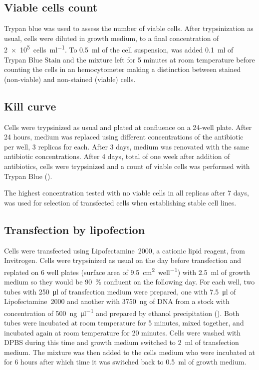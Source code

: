     \subsection{Viable cells count}
      \label{sec:methods:trypan-blue}
      Trypan blue was used to assess the number of viable cells.
      After trypsinization as usual, cells were diluted in growth medium,
      to a final concentration of \SI{2e5}{cells\per\ml}.
      To \SI{0.5}{\ml} of the cell suspension, was added \SI{0.1}{\ml}
      of  Trypan Blue Stain and the mixture left for 5 minutes
      at room temperature before counting
      the cells in an hemocytometer making a distinction between
      stained (non-viable) and non-stained (viable) cells.

    \subsection{Kill curve}
      \label{sec:methods:kill-curve}
      Cells were trypsinized as usual and plated at  confluence on
      a 24-well plate. After 24 hours, medium was replaced using different
      concentrations of the antibiotic per well, 3 replicas for each.
      After 3 days, medium was
      renovated with the same antibiotic concentrations. After 4 days, total of
      one week after addition of antibiotics, cells were trypsinized and a count
      of viable cells was performed with Trypan Blue ().

      The highest concentration tested with no viable cells in all replicas after
      7 days, was used for selection of transfected cells when establishing
      stable cell lines.

    \subsection{Transfection by lipofection}
      \label{methods:lipofection}
      Cells were transfected using Lipofectamine~2000, a cationic lipid
      reagent, from Invitrogen. Cells were trypsinized as usual on the
      day before transfection and replated on 6 well plates (surface area
      of \SI{9.5}{\square\cm\per well}) with \SI{2.5}{\ml} of growth
      medium so they would be \SI{90}{\percent} confluent on the following
      day. For each well, two tubes with \SI{250}{\ul} of transfection
      medium were prepared, one with \SI{7.5}{\ul} of Lipofectamine~2000
      and another with \SI{3750}{\ng} of DNA from a stock with concentration
      of \SI{500}{\ng\per\ul} and prepared by ethanol precipitation
      ().
      Both tubes were incubated at room temperature for 5 minutes,
      mixed together, and incubated again at room temperature for 20 minutes. Cells
      were washed with DPBS during this time and growth medium switched to \SI{2}{\ml}
      of transfection medium. The mixture was then added to the cells medium who
      were incubated at  for 6 hours after which time it was switched back to
      \SI{0.5}{\ml} of growth medium.

